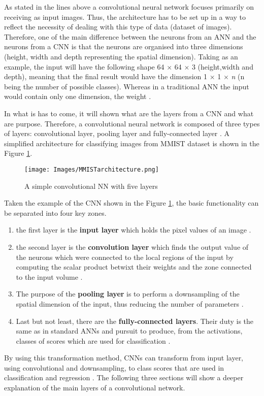 As stated in the lines above a convolutional neural network focuses primarily on receiving as input images. Thus, the architecture has to be set up in a way to reflect the necessity of dealing with this type of data (dataset of images). Therefore, one of the main difference between the neurons from an ANN and the neurons from a CNN is that the neurons are organised into three dimensions (height, width and depth representing the spatial dimension). Taking as an example, the input will have the following shape 64 $\times$ 64 $\times$ 3 (height,width and depth), meaning that the final result would have the dimension 1 $\times$ 1 $\times$ \textit{n} (n being the number of possible classes). Whereas in a traditional ANN the input would contain only one dimension, the weight \cite{IntroCNN, Largescale}. \par

In what is has to come, it will shown what are the layers from a CNN and what are purpose. Therefore, a convolutional neural network is composed of three types of layers: convolutional layer, pooling layer and fully-connected layer \cite{IntroCNN}. A simplified architecture for classifying images from MMIST dataset \cite{MMIST} is shown in the Figure \ref{fig:ex_mmistarchitecture}.

\begin{figure}[h!]
    \centering
    \texttt{[image: Images/MMISTarchitecture.png]}
    \caption{A simple convolutional NN with five layers \cite{IntroCNN}}
    \label{fig:ex_mmistarchitecture}
\end{figure}

Taken the example of the CNN shown in the Figure \ref{fig:ex_mmistarchitecture}, the basic functionality can be separated into four key zones. \par

\begin{enumerate}
    \item the first layer is the \textbf{input layer} which holds the pixel values of an image \cite{IntroCNN}.
    \item the second layer is the \textbf{convolution layer} which finds the output value of the neurons which were connected to the local regions of the input by computing the scalar product betwixt their weights and the zone connected to the input volume \cite{IntroCNN}.
    \item The purpose of the \textbf{pooling layer} is to perform a downsampling of the spatial dimension of the input, thus reducing the number of parameters \cite{IntroCNN}.
    \item Last but not least, there are the \textbf{fully-connected layers}. Their duty is the same as in standard ANNs and pursuit to produce, from the activations, classes of scores which are used for classification \cite{IntroCNN}.
\end{enumerate}

By using this transformation method, CNNs can transform from input layer, using convolutional and downsampling, to class scores that are used in classification and regression \cite{IntroCNN}. The following three sections will show a deeper explanation of the main layers of a convolutional network.